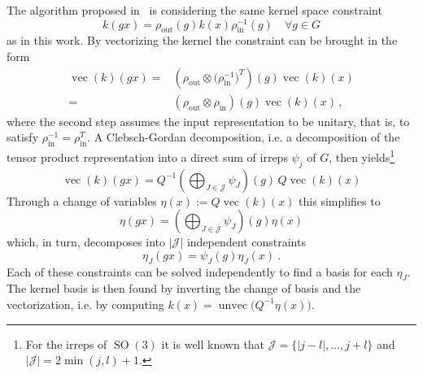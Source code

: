 \documentclass{article}
\newcommand{\lp}{\left(}
\newcommand{\rp}{\right)}
\newcommand{\SO}[1]{\ensuremath{\operatorname{SO}(#1)}}
\newcommand{\vc}[1]{\ensuremath{\operatorname{vec}\!\lp{#1}\rp}}
\begin{document}
The algorithm proposed in~\cite{3d_steerableCNNs} is considering the same kernel space constraint
\[
    k(gx) = \rho_\text{out}(g) k(x) \rho_\text{in}^{-1}(g) \quad\forall g\in G
\]
as in this work.
By vectorizing the kernel the constraint can be brought in the form
\begin{align*}
    \vc{k}(gx) =& \lp \rho_\text{out} \otimes \big(\rho_\text{in}^{-1}\big)^T \rp (g) \vc{k}(x) \\
               =& \lp \rho_\text{out} \otimes      \rho_\text{in}             \rp (g) \vc{k}(x) \,,
\end{align*}
where the second step assumes the input representation to be unitary, that is, to satisfy $\rho_\text{in}^{-1}=\rho_\text{in}^T$.
A Clebsch-Gordan decomposition, i.e. a decomposition of the tensor product representation into a direct sum of irreps $\psi_j$ of $G$, then yields\footnote{For the irreps of $\SO3$ it is well known that $\mathcal{J}=\{|j-l|,\dots,j+l\}$ and $|\mathcal{J}|=2\min(j,l)+1$.}
\[
    \vc{k}(gx) = Q^{-1} \lp \bigoplus\nolimits_{J \in \mathcal{J}} \psi_J \rp\!(g)\, Q \vc{k}(x)
\]
Through a change of variables $\eta(x) := Q \vc{k}\!(x)$ this simplifies to
\[
    \eta(gx) = \lp \bigoplus\nolimits_{J \in \mathcal{J}} \psi_J \rp\! (g) \eta(x)
\]
which, in turn, decomposes into $|\mathcal{J}|$ independent constraints
\[
    \eta_J(gx) = \psi_J (g) \eta_J(x) \ .
\]
Each of these constraints can be solved independently to find a basis for each $\eta_J$.
The kernel basis is then found by inverting the change of basis and the vectorization, i.e. by computing $k(x)=\operatorname{unvec}\!\big(Q^{-1}\eta(x)\big)$.
\end{document}
